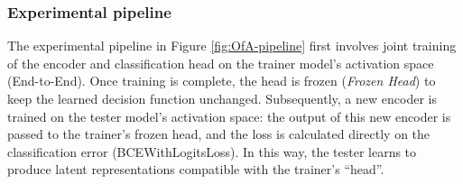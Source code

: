 \subsubsection{Experimental pipeline}
The experimental pipeline in Figure \ref{fig:OfA-pipeline} first involves joint training of the encoder and classification head on the trainer model's activation space (End-to-End). Once training is complete, the head is frozen (\emph{Frozen Head}) to keep the learned decision function unchanged. Subsequently, a new encoder is trained on the tester model's activation space: the output of this new encoder is passed to the trainer's frozen head, and the loss is calculated directly on the classification error (BCEWithLogitsLoss). In this way, the tester learns to produce latent representations compatible with the trainer's ``head''.


